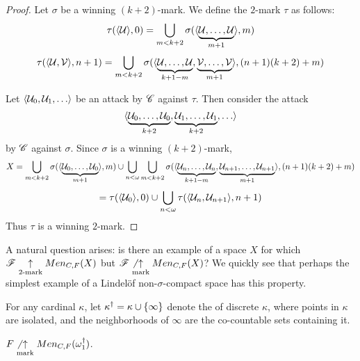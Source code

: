 \begin{proof}
  Let $\sigma$ be a winning $(k+2)$-mark. We define the $2$-mark $\tau$ as
  follows:
    \[
      \tau(\langle\mathcal{U}\rangle,0)
        =
      \bigcup_{m<k+2}
        \sigma(\langle\underbrace{\mathcal{U},\dots,\mathcal{U}}_{m+1}\rangle,m)
    \]
    \[
      \tau(\langle\mathcal{U},\mathcal{V}\rangle,n+1)
        =
      \bigcup_{m<k+2}
        \sigma(\langle
          \underbrace{\mathcal{U},\dots,\mathcal{U}}_{k+1-m},
          \underbrace{\mathcal{V},\dots,\mathcal{V}}_{m+1}
        \rangle,(n+1)(k+2)+m)
    \]

  Let $\<\mc U_0,\mc U_1,\dots\>$ be an attack by $\mathscr{C}$ against $\tau$.
  Then consider the attack
    \[
      \<
        \underbrace{\mc U_0,\dots,\mc U_0}_{k+2},
        \underbrace{\mc U_1,\dots,\mc U_1}_{k+2},
        \dots
      \>
    \]
  by $\mathscr{C}$ against $\sigma$. Since $\sigma$ is a winning $(k+2)$-mark,
    \[
      X
        =
      \bigcup_{m<k+2}
        \sigma(\langle\underbrace{\mathcal{U}_0,\dots,\mathcal{U}_0}_{m+1}\rangle,m)
      \cup
      \bigcup_{n<\omega}
      \bigcup_{m<k+2}
        \sigma(\langle
          \underbrace{\mathcal{U}_n,\dots,\mathcal{U}_n}_{k+1-m},
          \underbrace{\mathcal{U}_{n+1},\dots,\mathcal{U}_{n+1}}_{m+1}
        \rangle,(n+1)(k+2)+m)
    \]
    \[
      =
      \tau(\langle\mathcal{U}_0\rangle,0)
      \cup
      \bigcup_{n<\omega}
      \tau(\langle\mathcal{U}_n,\mathcal{U}_{n+1}\rangle,n+1)
    \]
  Thus $\tau$ is a winning $2$-mark.
\end{proof}

A natural question arises: is there an example of a space $X$ for which
$\mathscr{F}\underset{2\text{-mark}}{\uparrow}Men_{C,F}(X)$ but $\mathscr{F}\not\underset{\text{mark}}{\uparrow}Men_{C,F}(X)$? We quickly
see that perhaps the simplest example of a Lindel\"of non-$\sigma$-compact
space has this property.

\begin{defn}
  For any cardinal $\kappa$, let $\kappa^\dagger=\kappa\cup\{\infty\}$ denote
  the  of discrete $\kappa$, where points in
  $\kappa$ are isolated, and the neighborhoods of $\infty$ are the co-countable
  sets containing it.
\end{defn}

\begin{thm}
  $F\not\underset{\text{mark}}{\uparrow}Men_{C,F}(\omega_1^\dagger)$.
\end{thm}

